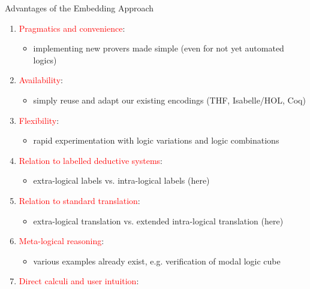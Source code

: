 \documentclass[9pt,mathserif,unknownkeysallowed,xcolor=dvipsnames]{beamer}
\newcommand{\chriscite}[1]{{\small \textcolor{gray}{[#1]}}}
\begin{document}
\begin{frame}{Advantages of the Embedding Approach}

\begin{enumerate}
\item \textcolor{red}{Pragmatics and convenience}:
  \begin{itemize}
  \item  implementing new provers made simple (even for not yet
    automated logics)
  \end{itemize}
\item \textcolor{red}{Availability}:
\begin{itemize}
  \item  simply  reuse and adapt our existing encodings (THF, Isabelle/HOL, Coq)
  \end{itemize}
\item \textcolor{red}{Flexibility}:
\begin{itemize}
  \item  rapid experimentation with logic variations and logic combinations 
  \end{itemize}
\item \textcolor{red}{Relation to labelled deductive systems}:
\begin{itemize}
  \item   extra-logical labels vs. intra-logical labels (here)
  \end{itemize} 
\item \textcolor{red}{Relation to standard translation}:
\begin{itemize}
  \item   extra-logical  translation vs. extended intra-logical translation (here)
  \end{itemize}
\item \textcolor{red}{Meta-logical reasoning}: 
\begin{itemize}
  \item  various examples already exist, e.g. verification of modal
  logic cube
  \end{itemize}
\item \textcolor{red}{Direct calculi and user intuition}: 
  \begin{itemize}

\end{itemize}
\end{enumerate}
\end{frame}
\end{document}
